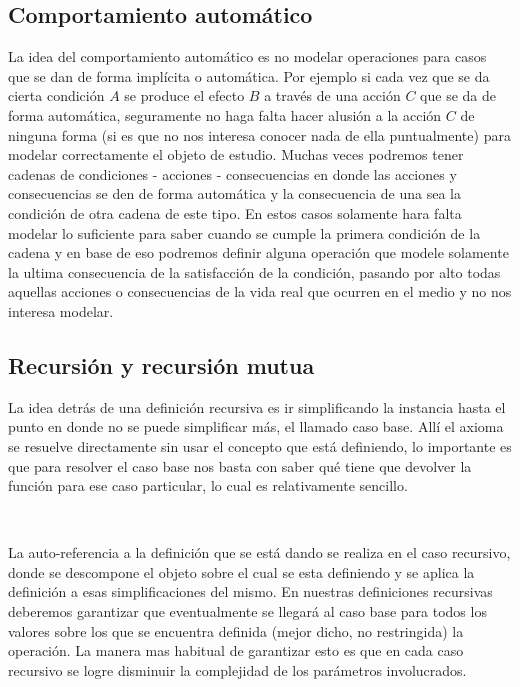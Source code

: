 \subsection{Comportamiento autom\'atico}

La idea del comportamiento autom\'atico es no modelar operaciones para casos que se dan de forma impl\'icita o autom\'atica. Por ejemplo si cada vez que se da cierta condici\'on $A$ se produce el efecto $B$ a trav\'es de una acci\'on $C$ que se da de forma autom\'atica, seguramente no haga falta hacer alusi\'on a la acci\'on $C$ de ninguna forma (si es que no nos interesa conocer nada de ella puntualmente) para modelar correctamente el objeto de estudio. Muchas veces podremos tener cadenas de condiciones - acciones - consecuencias en donde las acciones y consecuencias se den de forma autom\'atica y la consecuencia de una sea la condici\'on de otra cadena de este tipo. En estos casos solamente hara falta modelar lo suficiente para saber cuando se cumple la primera condici\'on de la cadena y en base de eso podremos definir alguna operaci\'on que modele solamente la ultima consecuencia de la satisfacci\'on de la condici\'on, pasando por alto todas aquellas acciones o consecuencias de la vida real que ocurren en 
el medio y no nos interesa modelar.

\subsection{Recursi\'on y recursi\'on mutua}

La idea detr\'as de una definici\'on recursiva es ir simplificando la instancia hasta el punto en donde no se puede simplificar m\'as, el llamado caso base. All\'i el axioma se resuelve directamente sin usar el concepto que est\'a definiendo, lo importante es que para resolver el caso base nos basta con saber qu\'e tiene que devolver la funci\'on para ese caso particular, lo cual es relativamente sencillo.

~

La auto-referencia a la definici\'on que se est\'a dando se realiza en el caso recursivo, donde se descompone el objeto sobre el cual se esta definiendo y se aplica la definici\'on a esas simplificaciones del mismo. En nuestras definiciones recursivas deberemos garantizar que eventualmente se llegar\'a al caso base para todos los valores sobre los que se encuentra definida (mejor dicho, no restringida) la operaci\'on. La manera mas habitual de garantizar esto es que en cada caso recursivo se logre disminuir la complejidad de los par\'ametros involucrados.

